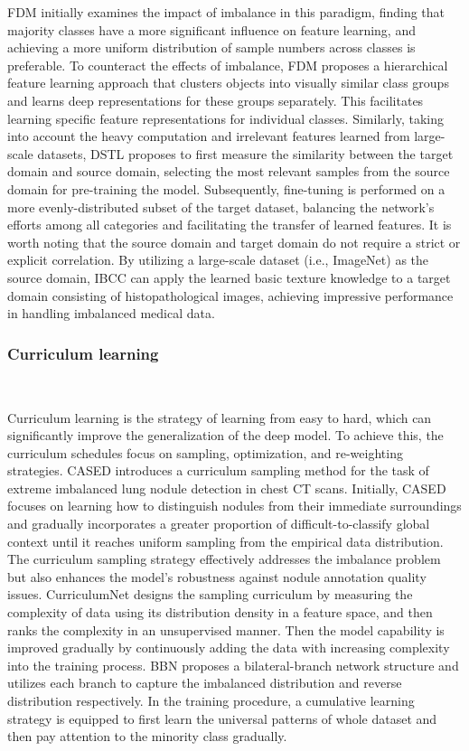 FDM \cite{ouyang2016factors} initially examines the impact of imbalance in this paradigm, finding that majority classes have a more significant influence on feature learning, and achieving a more uniform distribution of sample numbers across classes is preferable. To counteract the effects of imbalance, FDM proposes a hierarchical feature learning approach that clusters objects into visually similar class groups and learns deep representations for these groups separately. This facilitates learning specific feature representations for individual classes.
Similarly, taking into account the heavy computation and irrelevant features learned from large-scale datasets, DSTL \cite{cui2018large} proposes to first measure the similarity between the target domain and source domain, selecting the most relevant samples from the source domain for pre-training the model. Subsequently, fine-tuning is performed on a more evenly-distributed subset of the target dataset, balancing the network's efforts among all categories and facilitating the transfer of learned features.
It is worth noting that the source domain and target domain do not require a strict or explicit correlation. By utilizing a large-scale dataset (i.e., ImageNet) as the source domain, IBCC \cite{singh2020imbalanced} can apply the learned basic texture knowledge to a target domain consisting of histopathological images, achieving impressive performance in handling imbalanced medical data.



\subsubsection{Curriculum learning}\
\label{s333}

Curriculum learning \cite{bengio2009curriculum} is the strategy of learning from easy to hard, which can significantly improve the generalization of the deep model. To achieve this, the curriculum schedules focus on sampling, optimization, and re-weighting strategies.
CASED \cite{jesson2017cased} introduces a curriculum sampling method for the task of extreme imbalanced lung nodule detection in chest CT scans. Initially, CASED focuses on learning how to distinguish nodules from their immediate surroundings and gradually incorporates a greater proportion of difficult-to-classify global context until it reaches uniform sampling from the empirical data distribution. The curriculum sampling strategy effectively addresses the imbalance problem but also enhances the model's robustness against nodule annotation quality issues.
CurriculumNet \cite{guo2018curriculumnet} designs the sampling curriculum by measuring the complexity of data using its distribution density in a feature space, and then ranks the complexity in an unsupervised manner. Then the model capability is improved gradually by continuously adding the data with increasing complexity into the training process.
BBN \cite{zhou2020bbn} proposes a bilateral-branch network structure and utilizes each branch to capture the imbalanced distribution and reverse distribution respectively. In the training procedure, a cumulative learning strategy is equipped to first learn the universal patterns of whole dataset and then pay attention to the minority class gradually.

